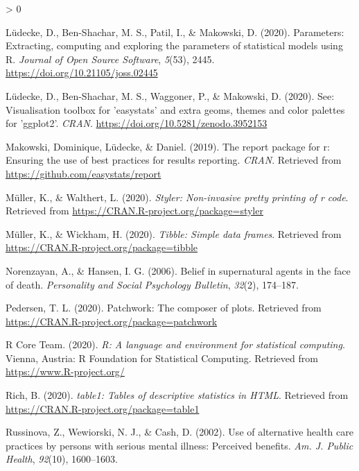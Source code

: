 \documentclass[
  english,
  man,floatsintext]{apa6}
\newlength{\cslhangindent}
\newenvironment{CSLReferences}[2] %
 {%
  \setlength{\parindent}{0pt}
  \ifodd #1 \everypar{\setlength{\hangindent}{\cslhangindent}}\ignorespaces\fi
  \ifnum #2 > 0
  \setlength{\parskip}{#2\baselineskip}
  \fi
 }%
 {}
\begin{document}
\begin{CSLReferences}{1}{0}
\leavevmode\hypertarget{ref-R-parameters}{}%
Lüdecke, D., Ben-Shachar, M. S., Patil, I., \& Makowski, D. (2020). Parameters: Extracting, computing and exploring the parameters of statistical models using {R}. \emph{Journal of Open Source Software}, \emph{5}(53), 2445. \url{https://doi.org/10.21105/joss.02445}

\leavevmode\hypertarget{ref-R-see}{}%
Lüdecke, D., Ben-Shachar, M. S., Waggoner, P., \& Makowski, D. (2020). See: Visualisation toolbox for 'easystats' and extra geoms, themes and color palettes for 'ggplot2'. \emph{CRAN}. \url{https://doi.org/10.5281/zenodo.3952153}

\leavevmode\hypertarget{ref-R-report}{}%
Makowski, Dominique, Lüdecke, \& Daniel. (2019). The report package for r: Ensuring the use of best practices for results reporting. \emph{CRAN}. Retrieved from \url{https://github.com/easystats/report}

\leavevmode\hypertarget{ref-R-styler}{}%
Müller, K., \& Walthert, L. (2020). \emph{Styler: Non-invasive pretty printing of r code}. Retrieved from \url{https://CRAN.R-project.org/package=styler}

\leavevmode\hypertarget{ref-R-tibble}{}%
Müller, K., \& Wickham, H. (2020). \emph{Tibble: Simple data frames}. Retrieved from \url{https://CRAN.R-project.org/package=tibble}

\leavevmode\hypertarget{ref-norenzayan2006belief}{}%
Norenzayan, A., \& Hansen, I. G. (2006). Belief in supernatural agents in the face of death. \emph{Personality and Social Psychology Bulletin}, \emph{32}(2), 174--187.

\leavevmode\hypertarget{ref-R-patchwork}{}%
Pedersen, T. L. (2020). Patchwork: The composer of plots. Retrieved from \url{https://CRAN.R-project.org/package=patchwork}

\leavevmode\hypertarget{ref-R-base}{}%
R Core Team. (2020). \emph{R: A language and environment for statistical computing}. Vienna, Austria: R Foundation for Statistical Computing. Retrieved from \url{https://www.R-project.org/}

\leavevmode\hypertarget{ref-R-table1}{}%
Rich, B. (2020). \emph{table1: Tables of descriptive statistics in HTML}. Retrieved from \url{https://CRAN.R-project.org/package=table1}

\leavevmode\hypertarget{ref-Russinova2002-rq}{}%
Russinova, Z., Wewiorski, N. J., \& Cash, D. (2002). Use of alternative health care practices by persons with serious mental illness: Perceived benefits. \emph{Am. J. Public Health}, \emph{92}(10), 1600--1603.


\end{CSLReferences}
\end{document}
